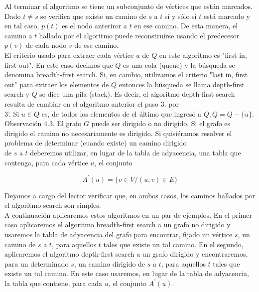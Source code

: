 \documentclass[10pt]{article}
\begin{document}
Al terminar el algoritmo se tiene un subconjunto de vértices que están marcados. Dado $t \neq s$ se verifica que existe un camino de $s$ a $t$ si y sólo si $t$ está marcado y en tal caso, $p(t)$ es el nodo anteriror a $t$ en ese camino. De esta manera, el camino a $t$ hallado por el algoritmo puede reconstruírse usando el predecesor $p(v)$ de cada nodo $v$ de ese camino.\\
El criterio usado para extraer cada vértice $u$ de $Q$ en este algoritmo es "first in, first out". En este caso decimos que $Q$ es una cola (queue) y la búsqueda se denomina breadth-first search. Si, en cambio, utilizamos el criterio "last in, first out" para extraer los elementos de $Q$ entonces la búsqueda se llama depth-first search y $Q$ se dice una pila (stack). Es decir, el algoritmo depth-first search resulta de cambiar en el algoritmo anterior el paso 3. por\\
3'. Si $u \in Q$ es, de todos los elementos de el último que ingresó a $Q, Q=Q-\{u\}$.\\
Observación 4.3. El grafo $G$ puede ser dirigido o no dirigido. Si el grafo es dirigido el camino no necesariamente es dirigido. Si quisiéramos resolver el problema de determinar (cuando existe) un camino dirigido\\
de $s$ a $t$ deberemos utilizar, en lugar de la tabla de adyacencia, una tabla que contenga, para cada vértice $u$, el conjunto

$$
A^{\prime}(u)=\{v \in V /(u, v) \in E\}
$$

Dejamos a cargo del lector verificar que, en ambos casos, los caminos hallados por el algoritmo search son simples.\\
A continuación aplicaremos estos algoritmos en un par de ejemplos. En el primer caso aplicaremos el algoritmo breadth-first search a un grafo no dirigido y usaremos la tabla de adyacencia del grafo para encontrar, fijado un vértice $s$, un camino de $s$ a $t$, para aquellos $t$ tales que existe un tal camino. En el segundo, aplicaremos el algoritmo depth-first search a un grafo dirigido y encontraremos, para un determinado $s$, un camino dirigido de $s$ a $t$, para aquellos $t$ tales que existe un tal camino. En este caso usaremos, en lugar de la tabla de adyacencia, la tabla que contiene, para cada $u$, el conjunto $A^{\prime}(u)$.
\end{document}
